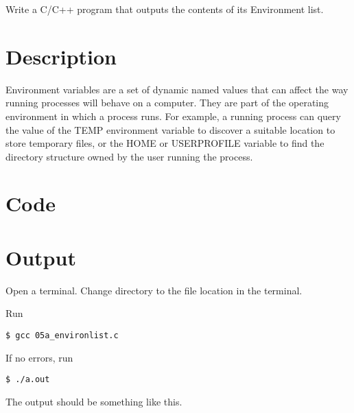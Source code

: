 Write a C/C++ program that outputs the contents of its Environment list.

\section{Description}


Environment variables are a set of dynamic named values that can affect the way running processes will behave on a computer. They are part of the operating environment in which a process runs. For example, a running process can query the value of the TEMP environment variable to discover a suitable location to store temporary files, or the HOME or USERPROFILE variable to find the directory structure owned by the user running the process.
	

\section{Code}



\section{Output}

Open a terminal. Change directory to the file location in the terminal.

Run
\begin{lstlisting}[style=shell-command]
$ gcc 05a_environlist.c
\end{lstlisting}

If no errors, run
\begin{lstlisting}[style=shell-command]
$ ./a.out
\end{lstlisting}

The output should be something like this.

